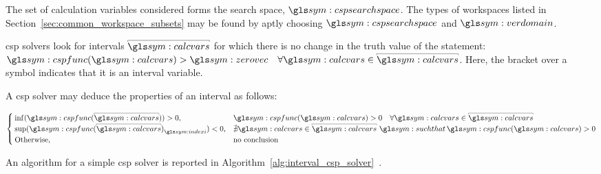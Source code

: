 				The set of calculation variables considered forms the search
				space, $\cspsearchspace$. The types of workspaces listed in
				Section~\ref{sec:common_workspace_subsets} may be found by aptly
				choosing $\cspsearchspace$ and $\verdomain$.

				\gls{csp} solvers look for intervals $\interval{\calcvars}$ for
				which there is no change in the truth value of the statement:
				\(
					\cspfunc(\calcvars)>\zerovec
						\quad\forall\calcvars\in\interval{\calcvars}
				\). Here, the bracket over a symbol indicates that it is an
				interval variable.

				A \gls{csp} solver may deduce the properties of an interval as
				follows:

				\begin{equation}
					\begin{cases}
						\inf(\cspfunc(\interval{\calcvars})) > 0, &
							\cspfunc(\calcvars) > 0
								\quad \forall\calcvars\in\interval{\calcvars}\\
						{\sup(\cspfunc(\interval{\calcvars})}_{\indexi}) < 0, &
							\nexists\calcvars\in\interval{\calcvars}\,\suchthat\,
								\cspfunc(\calcvars) > 0 \\
						\text{Otherwise}, & \text{no conclusion}
					\end{cases}
				\end{equation}

				An algorithm for a simple \gls{csp} solver is reported in
				Algorithm~\ref{alg:interval_csp_solver}~\cite{bib:cdpr:cable_driven_parallel_robots_theory_and_application}.

